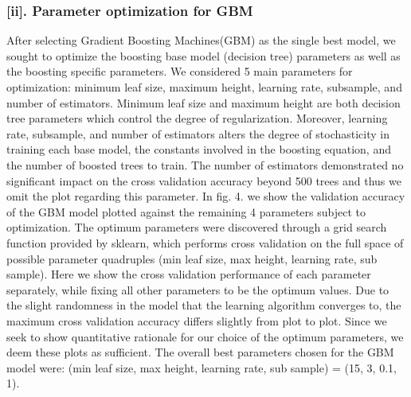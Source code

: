 \newpage

\subsubsection*{[ii]. Parameter optimization for GBM}
After selecting Gradient Boosting Machines(GBM) as the single best model, we sought to optimize the boosting base model (decision tree) parameters as well as the boosting specific parameters. We considered 5 main parameters for optimization: minimum leaf size, maximum height, learning rate, subsample, and number of estimators. Minimum leaf size and maximum height are both decision tree parameters which control the degree of regularization. Moreover, learning rate, subsample, and number of estimators alters the degree of stochasticity in training each base model, the constants involved in the boosting equation, and the number of boosted trees to train. The number of estimators demonstrated no significant impact on the cross validation accuracy beyond 500 trees and thus we omit the plot regarding this parameter. In fig. 4. we show the validation accuracy of the GBM model plotted against the remaining 4 parameters subject to optimization. The optimum parameters were discovered through a grid search function provided by sklearn, which performs cross validation on the full space of possible parameter quadruples (min leaf size, max height, learning rate, sub sample). Here we show the cross validation performance of each parameter separately, while fixing all other parameters to be the optimum values. Due to the slight randomness in the model that the learning algorithm converges to, the maximum cross validation accuracy differs slightly from plot to plot. Since we seek to show quantitative rationale for our choice of the optimum parameters, we deem these plots as sufficient. The overall best parameters chosen for the GBM model were: (min leaf size, max height, learning rate, sub sample) = (15, 3, 0.1, 1). 
